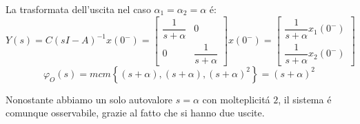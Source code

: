 \documentclass[../main.tex]{subfiles}
\begin{document}
\begin{Exercise}[title={Studiare l'osservabilit\'a di due vasche in parallelo}]
				La trasformata dell'uscita nel caso $ \alpha_1 = \alpha_2 = \alpha $ \'e:
				\[
					Y(s) = C(sI-A)^{-1} x(0^{-}) =
					\begin{bmatrix}
						\dfrac{1}{s+\alpha} & 0\\
						0 & \dfrac{1}{s+\alpha}
					\end{bmatrix} x(0^{-}) =
					\begin{bmatrix}
						\dfrac{1}{s+\alpha} x_1(0^{-})\\
						\dfrac{1}{s+\alpha} x_2(0^{-})
					\end{bmatrix}
				\]
				\[
					\varphi_O(s) = mcm\left\lbrace (s+\alpha), (s+\alpha), (s+\alpha)^2 \right\rbrace = (s+\alpha)^2
				\]
				
				Nonostante abbiamo un solo autovalore $ s = \alpha $ con molteplicit\'a $ 2 $, il sistema \'e comunque osservabile, grazie al fatto che si hanno due uscite.
		\end{Exercise}
\end{document}
